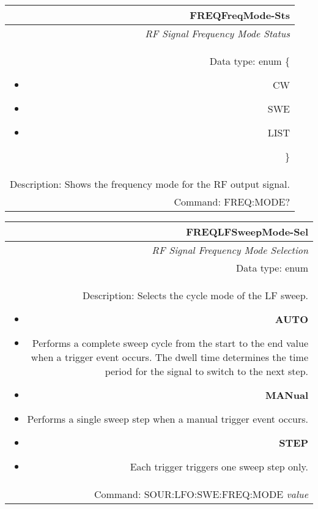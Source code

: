 \documentclass[openany]{article}
\begin{document}
		\begin{tabular}{N}
			\hline
			\bfseries FREQFreqMode-Sts \\ \hline
			\emph{RF Signal Frequency Mode Status} \\
			Data type: enum \{\begin{itemize}[noitemsep]
				\small
				\item[] CW
				\item[] SWE
				\item[] LIST
			\end{itemize}\} \\ 
			Description: Shows the frequency mode for the RF output signal. \\
			Command: FREQ:MODE? \\

		\end{tabular}
%
		\begin{tabular}{N}
			\hline
			\bfseries FREQLFSweepMode-Sel \\ \hline
			\emph{RF Signal Frequency Mode Selection} \\
			Data type: enum \\
			Description: Selects the cycle mode of the LF sweep.\begin{itemize}[noitemsep]
				\small
				\item[] \textbf{AUTO} 
				\item[] Performs a complete sweep cycle from the start to the end value when a trigger event occurs. The dwell time determines the time period for the signal to switch to the next step.
				\item[] \textbf{MANual}
				\item[] Performs a single sweep step when a manual trigger event occurs.
				\item[] \textbf{STEP}
				\item[] Each trigger triggers one sweep step only.
			\end{itemize} \\
			Command: SOUR:LFO:SWE:FREQ:MODE \emph{value} \\

		\end{tabular}
\end{document}
